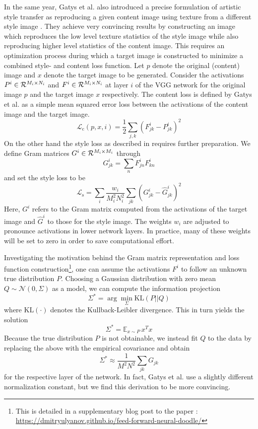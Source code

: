 
In the same year, Gatys et al. also introduced a precise formulation of artistic style transfer as reproducing a given content image using texture from a different style image \cite{gatys2015neural}. They achieve very convincing results by constructing an image which reproduces the low level texture statistics of the style image while also reproducing higher level statistics of the content image. 
This requires an optimization process during which a target image is constructed to minimize a combined style- and content loss function.
Let \(p\) denote the original (content) image and \(x\) denote the target image to be generated. 
Consider the activations \(P^i\in \mathcal{R}^{M_i\times N_i}\) and \(F^i\in \mathcal{R}^{M_i\times N_i}\) at layer \(i\) of the VGG network for the original image \(p\) and the target image \(x\) respectively.
The content loss is defined by Gatys et al. as a simple mean squared error loss between the activations of the content image and the target image.
\[\mathcal{L}_\text{c}(p,x,i) = \frac{1}{2}\sum_{j,k} (F^i_{jk}-P^i_{jk})^2\]
On the other hand the style loss as described in \cite{gatys2015texture} requires further preparation. We define Gram matrices \(G^i\in \mathcal{R}^{M_i\times M_i}\) through
\[G^i_{jk} = \sum_n F^i_{jn}F^i_{kn}\]
and set the style loss to be 
\[\mathcal{L}_\text{s} = \sum_i \frac{w_i}{M_i^2N_i^2} \sum_{jk} (G^i_{jk}-\hat G^i_{jk})^2\]
Here, \(G^i\) refers to the Gram matrix computed from the activations of the target image and \(\hat G^i\) to those for the style image. The weights \(w_i\) are adjusted to pronounce activations in lower network layers. In practice, many of these weights will be set to zero in order to save computational effort.

Investigating the motivation behind the Gram matrix representation and loss function construction\footnote{This is detailed in a supplementary blog post to the paper \cite{ulyanov2016texture}: \url{https://dmitryulyanov.github.io/feed-forward-neural-doodle/}}, one can assume the activations \(F^i\) to follow an unknown true distribution \(P\). Choosing a Gaussian distribution with zero mean \(Q\sim \mathcal{N}(0,\Sigma)\) as a model, we can compute the information projection
\[\Sigma^\ast = \arg\min_\Sigma \text{KL}(P||Q)\]
where \(\text{KL}(\cdot)\) denotes the Kullback-Leibler divergence. This in turn yields the solution
\[\Sigma^\ast = \mathbb{E}_{x\sim P} \,x^Tx\]
Because the true distribution \(P\) is not obtainable, we instead fit \(Q\) to the data by replacing the above with the empirical covariance and obtain
\[\Sigma^\ast \approx \frac{1}{M^2N^2} \sum_{jk} G_{jk}\]
for the respective layer of the network. In fact, Gatys et al. use a slightly different normalization constant, but we find this derivation to be more convincing.

